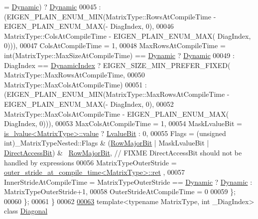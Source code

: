 \begin{DoxyCode}
      = \hyperlink{namespace_eigen_ad81fa7195215a0ce30017dfac309f0b2}{Dynamic}) ? \hyperlink{namespace_eigen_ad81fa7195215a0ce30017dfac309f0b2}{Dynamic}
00045                       : (EIGEN\_PLAIN\_ENUM\_MIN(MatrixType::RowsAtCompileTime - EIGEN\_PLAIN\_ENUM\_MAX(-
      DiagIndex, 0),
00046                                               MatrixType::ColsAtCompileTime - EIGEN\_PLAIN\_ENUM\_MAX( 
      DiagIndex, 0))),
00047     ColsAtCompileTime = 1,
00048     MaxRowsAtCompileTime = \textcolor{keywordtype}{int}(MatrixType::MaxSizeAtCompileTime) == \hyperlink{namespace_eigen_ad81fa7195215a0ce30017dfac309f0b2}{Dynamic} ? 
      \hyperlink{namespace_eigen_ad81fa7195215a0ce30017dfac309f0b2}{Dynamic}
00049                          : DiagIndex == \hyperlink{namespace_eigen_a73c597189a4a99127175e8167c456fff}{DynamicIndex} ? EIGEN\_SIZE\_MIN\_PREFER\_FIXED(
      MatrixType::MaxRowsAtCompileTime,
00050                                                                               
      MatrixType::MaxColsAtCompileTime)
00051                          : (EIGEN\_PLAIN\_ENUM\_MIN(MatrixType::MaxRowsAtCompileTime - EIGEN\_PLAIN\_ENUM\_MAX(-
      DiagIndex, 0),
00052                                                  MatrixType::MaxColsAtCompileTime - EIGEN\_PLAIN\_ENUM\_MAX( 
      DiagIndex, 0))),
00053     MaxColsAtCompileTime = 1,
00054     MaskLvalueBit = \hyperlink{struct_eigen_1_1internal_1_1is__lvalue}{is\_lvalue<MatrixType>::value} ? 
      \hyperlink{group__flags_gae2c323957f20dfdc6cb8f44428eaec1a}{LvalueBit} : 0,
00055     Flags = (\textcolor{keywordtype}{unsigned} \textcolor{keywordtype}{int})\_MatrixTypeNested::Flags & (\hyperlink{group__flags_gae4f56c2a60bbe4bd2e44c5b19cbe8762}{RowMajorBit} | MaskLvalueBit | 
      \hyperlink{group__flags_gabf1e9d0516a933445a4c307ad8f14915}{DirectAccessBit}) & ~\hyperlink{group__flags_gae4f56c2a60bbe4bd2e44c5b19cbe8762}{RowMajorBit}, \textcolor{comment}{// FIXME DirectAccessBit should not be handled
       by expressions}
00056     MatrixTypeOuterStride = \hyperlink{struct_eigen_1_1internal_1_1outer__stride__at__compile__time}{outer\_stride\_at\_compile\_time<MatrixType>::ret}
      ,
00057     InnerStrideAtCompileTime = MatrixTypeOuterStride == \hyperlink{namespace_eigen_ad81fa7195215a0ce30017dfac309f0b2}{Dynamic} ? \hyperlink{namespace_eigen_ad81fa7195215a0ce30017dfac309f0b2}{Dynamic} : 
      MatrixTypeOuterStride+1,
00058     OuterStrideAtCompileTime = 0
00059   \};
00060 \};
00061 \}
00062 
\hyperlink{group___core___module}{00063} \textcolor{keyword}{template}<\textcolor{keyword}{typename} MatrixType, \textcolor{keywordtype}{int} \_DiagIndex> \textcolor{keyword}{class }\hyperlink{group___core___module_class_eigen_1_1_diagonal}{Diagonal}

\end{DoxyCode}
